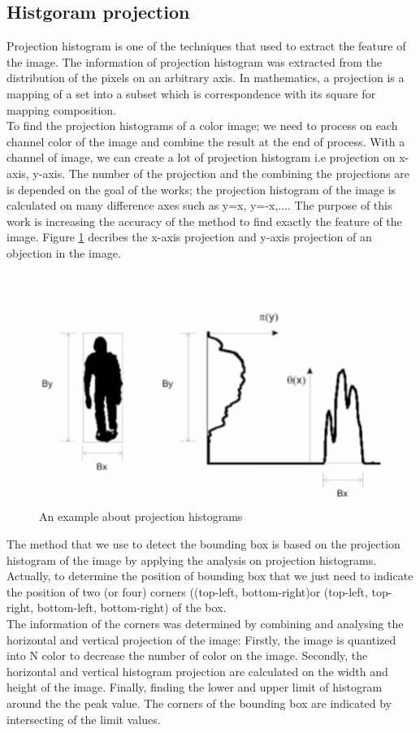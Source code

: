 \subsection{Histgoram projection}
Projection histogram is one of the techniques that used to extract the feature of the image. The information of projection histogram was extracted from the distribution of the pixels on an arbitrary axis. In mathematics, a projection is a mapping of a set into a subset which is correspondence with its square for mapping composition. \\[0.2cm]
To find the projection histograms of a color image; we need to process on each channel color of the image and combine the result at the end of process. With a channel of image, we can create a lot of projection histogram i.e projection on x-axis, y-axis. The number of the projection and the combining the projections are is depended on the goal of the works; the projection histogram of the image is calculated on many difference axes such as y=x, y=-x,.... The purpose of this work is increasing the accuracy of the method to find exactly the feature of the image. Figure \ref{fignprojection} decribes the x-axis projection and y-axis projection of an objection in the image.
\begin{figure}[h]
	\centering
	\includegraphics[scale=0.4]{images/projection}
	\caption{An example about projection histograms}
	\label{fignprojection}
\end{figure}

The method that we use to detect the bounding box is based on the projection histogram of the image by applying the analysis on projection histograms. Actually, to determine the position of bounding box that we just need to indicate the position of two (or four) corners ((top-left, bottom-right)or (top-left, top-right, bottom-left, bottom-right) of the box.\\[0.2cm]
The information of the corners was determined by combining and analysing the horizontal and vertical projection of the image: Firstly, the image is quantized into N color to decrease the number of color on the image. Secondly, the horizontal and vertical histogram projection are calculated on the width and height of the image. Finally, finding the lower and upper limit of histogram around the the peak value. The corners of the bounding box are indicated by intersecting of the limit values.
